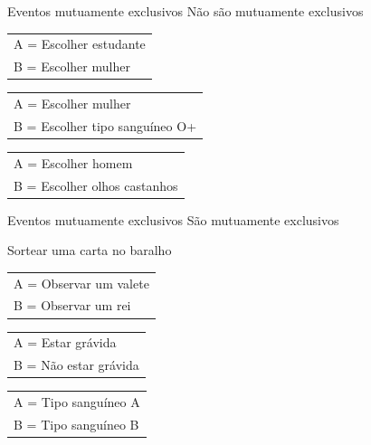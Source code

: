 \documentclass{beamer}
\begin{document}
\begin{frame}{Eventos mutuamente exclusivos}
  \alert{Não são} mutuamente exclusivos
  \begin{example}
    \begin{tabular}{l}
      A = Escolher estudante\\
      B = Escolher mulher\\
    \end{tabular}
  \end{example}
  \begin{example}
    \begin{tabular}{l}
      A = Escolher mulher\\
      B = Escolher tipo sanguíneo O+\\
    \end{tabular}
  \end{example}
  \begin{example}
    \begin{tabular}{l}
      A = Escolher homem\\
      B = Escolher olhos castanhos\\
    \end{tabular}
  \end{example}
\end{frame}

\begin{frame}{Eventos mutuamente exclusivos}
  \alert{São} mutuamente exclusivos
  \begin{example}
    Sortear uma carta no baralho
    \begin{tabular}{l}
      A = Observar um valete\\
      B = Observar um rei\\
    \end{tabular}
  \end{example}
  \begin{example}
    \begin{tabular}{l}
      A = Estar grávida\\
      B = Não estar grávida\\
    \end{tabular}
  \end{example}
  \begin{example}
    \begin{tabular}{l}
      A = Tipo sanguíneo A\\
      B = Tipo sanguíneo B\\
    \end{tabular}
  \end{example}
\end{frame}
\end{document}
